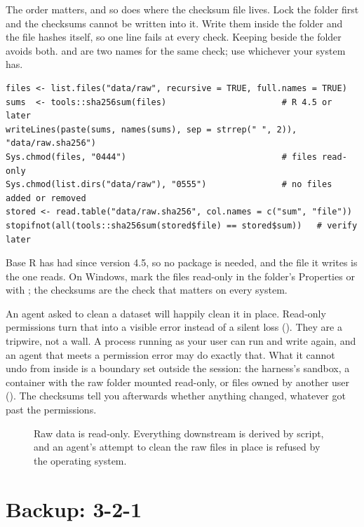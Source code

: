 The order matters, and so does where the checksum file lives. Lock the folder
first and the checksums cannot be written into it. Write them inside the
folder and the file hashes itself, so one line fails at every check. Keeping
 beside the folder avoids both.  and
 are two names for the same check; use whichever your system
has.

\begin{lstlisting}[caption={The same in R}]
files <- list.files("data/raw", recursive = TRUE, full.names = TRUE)
sums  <- tools::sha256sum(files)                       # R 4.5 or later
writeLines(paste(sums, names(sums), sep = strrep(" ", 2)), "data/raw.sha256")
Sys.chmod(files, "0444")                               # files read-only
Sys.chmod(list.dirs("data/raw"), "0555")               # no files added or removed
stored <- read.table("data/raw.sha256", col.names = c("sum", "file"))
stopifnot(all(tools::sha256sum(stored$file) == stored$sum))   # verify later
\end{lstlisting}

Base R has had  since version 4.5, so no package is
needed, and the file it writes is the one  reads. On Windows,
mark the files read-only in the folder's Properties or with ;
the checksums are the check that matters on every system.

An agent asked to clean a dataset will happily clean it in place. Read-only
permissions turn that into a visible error instead of a silent loss
(). They are a tripwire, not a wall. A process running
as your user can run  and write again, and an agent that
meets a permission error may do exactly that. What it cannot undo from inside
is a boundary set outside the session: the harness's sandbox, a container
with the raw folder mounted read-only, or files owned by another user
(). The checksums tell you afterwards whether anything
changed, whatever got past the permissions.

\begin{figure}[htbp]
\centering
{}
\caption{Raw data is read-only. Everything downstream is derived by script, and
an agent's attempt to clean the raw files in place is refused by the operating
system.}
\label{fig:rawreadonly}
\end{figure}

\section{Backup: 3-2-1}

